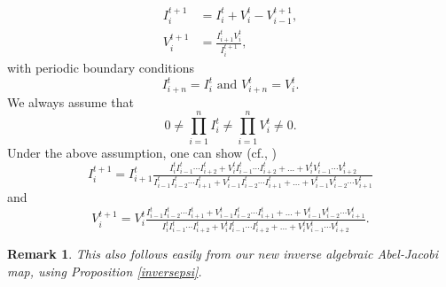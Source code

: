 \documentclass[11pt, a4paper]{amsart}
\newcommand{\eq}[1]{\begin{equation}#1 \end{equation}}
\newcommand{\eqst}[1]{\begin{equation*}#1\end{equation*}}
\theoremstyle{plain}
\newtheorem{remark}{Remark}[section]
\numberwithin{equation}{section}
\begin{document}
\eq{
\label{dpTflow}
\begin{split}
I^{t+1}_i &= I_i^t+V_i^t-V^{t+1}_{i-1}, \\
V_i^{t+1} &= \frac{I^t_{i+1} V_i^t}{I_i^{t+1}},
\end{split}
}
with periodic boundary conditions
\eq{\label{periodicbc} I_{i+n}^t = I_i^t \text{ and } V_{i+n}^t = V_i^t.}
We always assume that \eqst{0 \neq \prod_{i=1}^n I^t_i \neq \prod_{i=1}^n V^t_i \neq 0 .}
Under the above assumption, one can show (cf., \cite{tokihiro1})
\eqst{ I^{t+1}_i = I^{t}_{i+1}\tfrac{I_i^t I_{i-1}^t\cdots I^t_{i+2} + V^t_i I^t_{i-1}\cdots I^t_{i+2}+\dots+V^t_iV^t_{i-1}\cdots V^t_{i+2}}{I_{i-1}^tI_{i-2}^t\cdots I_{i+1}^t + V^t_{i-1}I^t_{i-2}\cdots I^t_{i+1}+\dots+V^t_{i-1} V^t_{i-2}\cdots V^t_{i+1}}} and \eqst{V^{t+1}_i = V_i^t \tfrac{I_{i-1}^tI_{i-2}^t\cdots I_{i+1}^t + V^t_{i-1}I^t_{i-2}\cdots I^t_{i+1}+\dots+V^t_{i-1} V^t_{i-2}\cdots V^t_{i+1}}{I_i^t I_{i-1}^t\cdots I^t_{i+2} + V^t_i I^t_{i-1}\cdots I^t_{i+2}+\dots+V^t_iV^t_{i-1}\cdots V^t_{i+2}}.} 
\begin{remark}
This also follows easily from our new inverse algebraic Abel-Jacobi map, using Proposition \ref{inversepsi}.
\end{remark}
\end{document}
